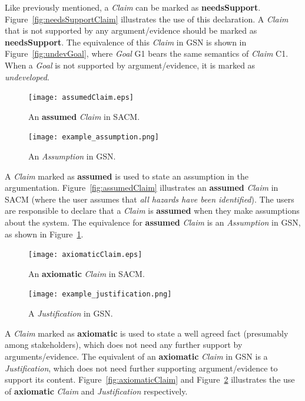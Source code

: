 Like previously mentioned, a \textit{Claim} can be marked as \textbf{needsSupport}. Figure~\ref{fig:needsSupportClaim} illustrates the use of this declaration. 
A \textit{Claim} that is not supported by any argument/evidence should be marked as \textbf{needsSupport}. 
The equivalence of this \textit{Claim} in GSN is shown in Figure~\ref{fig:undevGoal}, where \textit{Goal} G1 bears the same semantics of \textit{Claim} C1. 
When a \textit{Goal} is not supported by argument/evidence, it is marked as \textit{undeveloped}. 

\begin{figure}
	\centering
	\begin{minipage}[b]{0.7\textwidth}
		\texttt{[image: assumedClaim.eps]}
		\caption{An \textbf{assumed} \textit{Claim} in SACM.}
		\label{fig:assumedClaim}
	\end{minipage}
	\hfill
	\begin{minipage}[b]{0.28\textwidth}
		\texttt{[image: example\_assumption.png]}
		\caption{An \textit{Assumption} in GSN.}
		\label{fig:example_assumption}
	\end{minipage}
\end{figure}

A \textit{Claim} marked as \textbf{assumed} is used to state an assumption in the argumentation. Figure~\ref{fig:assumedClaim} illustrates an \textbf{assumed} \textit{Claim} in SACM (where the user assumes that \textit{all hazards have been identified}). 
The users are responsible to declare that a \textit{Claim} is \textbf{assumed} when they make assumptions about the system. 
The equivalence for \textbf{assumed} \textit{Claim} is an \textit{Assumption} in GSN, as shown in Figure~\ref{fig:example_assumption}.

\begin{figure}
	\centering
	\begin{minipage}[b]{0.7\textwidth}
		\texttt{[image: axiomaticClaim.eps]}
		\caption{An \textbf{axiomatic} \textit{Claim} in SACM.}
		\label{fig:axiomaticClaim}
	\end{minipage}
	\hfill
	\begin{minipage}[b]{0.28\textwidth}
		\texttt{[image: example\_justification.png]}
		\caption{A \textit{Justification} in GSN.}
		\label{fig:example_justification}
	\end{minipage}
\end{figure}

A \textit{Claim} marked as \textbf{axiomatic} is used to state a well agreed fact (presumably among stakeholders), which does not need any further support by arguments/evidence. 
The equivalent of an \textbf{axiomatic} \textit{Claim} in GSN is a \textit{Justification}, which does not need further supporting argument/evidence to support its content. 
Figure~\ref{fig:axiomaticClaim} and Figure~\ref{fig:example_justification} illustrates the use of \textbf{axiomatic} \textit{Claim} and \textit{Justification} respectively.

